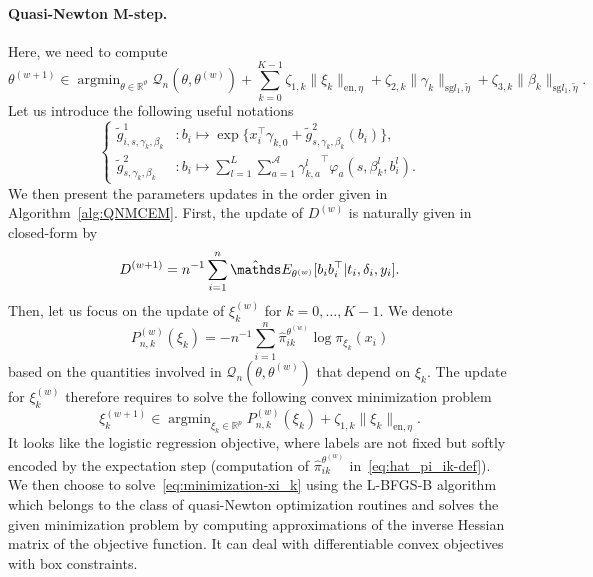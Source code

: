 \documentclass[11pt]{article}
\DeclareMathOperator{\argmin}{argmin}
\newcommand{\norm}[1]{\|#1\|}
\newcommand{\cA}{\mathcal A}
\newcommand{\cQ}{\mathcal Q}
\newcommand{\R}{\mathds R}
\newcommand{\E}{\mathds E}
\begin{document}
\paragraph*{Quasi-Newton M-step.}
Here, we need to compute \[\theta^{(w+1)} \in \argmin_{\theta \in \R^\vartheta} \cQ_n(\theta, \theta^{(w)}) + \sum_{k=0}^{K-1} \zeta_{1,k} \norm{\xi_k}_{\text{en}, \eta} + \zeta_{2,k} \norm{\gamma_k}_{\text{sg} l_1, \tilde{\eta}} + \zeta_{3,k} \norm{\beta_k}_{\text{sg} l_1, \tilde{\eta}}.\]
Let us introduce the following useful notations
\begin{equation}
  \label{eq:g-tilde-1-2}
  \left\{
    \begin{array}{ll}
        \tilde g_{i, s, \gamma_k, \beta_k}^1&: b_i \mapsto \exp \big\{ x_i^\top \gamma_{k,0} + \tilde g_{s, \gamma_k, \beta_k}^2(b_i) \big\}, \\
        \tilde g_{s, \gamma_k, \beta_k}^2&: b_i \mapsto \sum_{l=1}^L \sum_{a=1}^\cA {\gamma_{k,a}^l}^\top \varphi_a(s, \beta_k^l, b_i^l).
    \end{array}
  \right. 
\end{equation}
We then present the parameters updates in the order given in Algorithm~\ref{alg:QNMCEM}.
First, the update of $D^{(w)}$ is naturally given in closed-form by
\begin{equation}
  \label{eq:update_D}
  D^{(w+1)} = n^{-1} \sum_{i=1}^n \hat \E_{\theta^{(w)}}[ b_i b_i^\top | t_i, \delta_i, y_i].
\end{equation}
Then, let us focus on the update of $\xi_k^{(w)}$ for $k=0, \ldots, K-1$. We denote
\[ P^{(w)}_{n,k}(\xi_k) = -n^{-1} \sum_{i=1}^n \hat \pi_{ik}^{\theta^{(w)}} \log \pi_{\xi_k}(x_i) \]
based on the quantities involved in $\cQ_n(\theta, \theta^{(w)})$ that depend on $\xi_k$. The update for $\xi_k^{(w)}$ therefore requires to solve the following convex minimization problem
\begin{equation}
  \label{eq:minimization-xi_k}
  \xi_k^{(w+1)} \in \argmin_{\xi_k \in \R^p} P^{(w)}_{n,k}(\xi_k) + \zeta_{1,k} \norm{\xi_k}_{\text{en}, \eta}.
\end{equation}
It looks like the logistic regression objective, where labels are not fixed but softly encoded by the expectation step (computation of $\hat \pi_{ik}^{\theta^{(w)}}$ in~\eqref{eq:hat_pi_ik-def}). We then choose to solve~\eqref{eq:minimization-xi_k} using the L-BFGS-B algorithm~\citep{zhu1997algorithm} which belongs to the class of quasi-Newton optimization routines and solves the given minimization problem by computing approximations
of the inverse Hessian matrix of the objective function. It can deal with differentiable convex objectives with box constraints.
\end{document}
